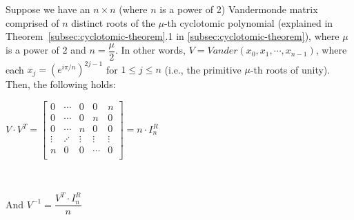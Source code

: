 \begin{tcolorbox}[title={\textbf{\tboxtheorem{\ref*{subsec:vandermonde-euler}} Vandermonde Matrix with the Roots of  \text{(power-of-2)}-th Cyclotomic Polynomial}}]

Suppose we have an $n \times n$ (where $n$ is a power of 2) Vandermonde matrix comprised of $n$ distinct roots of the $\mu$-th cyclotomic polynomial (explained in Theorem~\ref*{subsec:cyclotomic-theorem}.1 in \autoref{subsec:cyclotomic-theorem}), where $\mu$ is a power of 2 and $n = \dfrac{\mu}{2}$. In other words, $V = \mathit{Vander}(x_0, x_1, \cdots, x_{n-1})$, where each $x_j = (e^{i\pi/n})^{2j-1}$ for $1 \leq j \leq n$ (i.e., the primitive $\mu$-th roots of unity). Then, the following holds:

$V \cdot V^T = \begin{bmatrix}
0 & \cdots & 0 & 0 & n\\
0 & \cdots & 0 & n & 0\\
0 & \cdots & n & 0 & 0\\
\vdots & \iddots & \vdots & \vdots & \vdots \\
n & 0 & 0 & \cdots & 0\\
\end{bmatrix} = n \cdot I^R_n$

$ $

And $V^{-1} = \dfrac{V^T \cdot I_n^R}{n}$


\end{tcolorbox}

